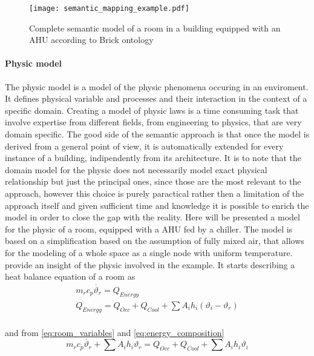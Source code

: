 \begin{figure}
  \texttt{[image: semantic\_mapping\_example.pdf]}
  \caption{Complete semantic model of a room in a building equipped with an AHU according to Brick ontology}
  \label{fig:semantic_mapping_example}
\end{figure}

\paragraph{Physic model}
The physic model is a model of the physic phenomena occuring in an enviroment. It defines physical variable and processes and their interaction in the context of a specific domain. Creating a model of physic laws is a time consuming task that involve expertise from different fields, from engineering to physics, that are very domain specific. The good side of the semantic approach is that once the model is derived from a general point of view, it is automatically extended for every instance of a building, indipendently from its architecture. It is to note that the domain model for the physic does not necessarily model exact physical relationship but just the principal ones, since those are the most relevant to the approach, however this choice is purely paractical rather then a limitation of the approach itself and given sufficient time and knowledge it is possible to enrich the model in order to close the gap with the reality. Here will be presented a model for the physic of a room, equipped with a AHU fed by a chiller. The model is based on a simplification based on the assumption of fully mixed air, that allows for the modeling of a whole space as a single node with uniform temperature. \textcite{building_room_physics} provide an insight of the physic involved in the example. It starts describing a heat balance equation of a room as
\begin{gather}
  m_rc_p\dot{\vartheta_{r}}=Q_{Energy}\label{eq:room_variables}\\
  Q_{Energy}=Q_{Occ}+Q_{Cool}+\sum{A_ih_i(\vartheta_{i}-\vartheta_{r})}\label{eq:energy_composition}\\
\end{gather}

and from \autoref{eq:room_variables} and \autoref{eq:energy_composition}
\begin{equation}
  m_rc_p\dot{\vartheta_{r}}+\sum{A_ih_i\vartheta_{r}}=Q_{Occ}+Q_{Cool}+\sum{A_ih_i\vartheta_{i}} \label{eq:room_lag}
\end{equation}


